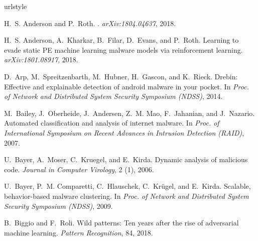 \documentclass[conference]{IEEEtran}
\begin{document}
{\footnotesize

\begin{thebibliography}{47}
	\providecommand{\natexlab}[1]{#1}
	\providecommand{\url}[1]{\texttt{#1}}
	\expandafter\ifx\csname urlstyle\endcsname\relax
	\providecommand{\doi}[1]{doi: #1}\else
	\providecommand{\doi}{doi: \begingroup \urlstyle{rm}\Url}\fi
	
	H.~S. {Anderson} and P.~{Roth}.
	.
	\newblock \emph{arXiv:1804.04637}, 2018.
	
	H.~S. Anderson, A.~Kharkar, B.~Filar, D.~Evans, and P.~Roth.
	\newblock Learning to evade static {PE} machine learning malware 
	models via
	reinforcement learning.
	\newblock \emph{arXiv:1801.08917}, 2018.
	
	D.~Arp, M.~Spreitzenbarth, M.~Hubner, H.~Gascon, and K.~Rieck.
	\newblock Drebin: Effective and explainable detection of android 
	malware in
	your pocket.
	\newblock In \emph{Proc. of Network and Distributed System Security 
	Symposium
		({NDSS})}, 2014.
	
	M.~Bailey, J.~Oberheide, J.~Andersen, Z.~M. Mao, F.~Jahanian, and 
	J.~Nazario.
	\newblock Automated classification and analysis of internet malware.
	\newblock In \emph{Proc. of International Symposium on Recent 
	Advances in
		Intrusion Detection ({RAID})}, 2007.
	
	U.~Bayer, A.~Moser, C.~Kruegel, and E.~Kirda.
	\newblock Dynamic analysis of malicious code.
	\newblock \emph{Journal in Computer Virology}, 2 (1), 2006.
	
	U.~Bayer, P.~M. Comparetti, C.~Hlauschek, C.~Krügel, and E.~Kirda.
	\newblock Scalable, behavior-based malware clustering.
	\newblock In \emph{Proc. of Network and Distributed System Security 
	Symposium
		({NDSS})}, 2009.
	
	B.~Biggio and F.~Roli.
	\newblock Wild patterns: Ten years after the rise of adversarial 
	machine
	learning.
	\newblock \emph{Pattern Recognition}, 84, 2018.
	

\end{thebibliography}}
\end{document}
